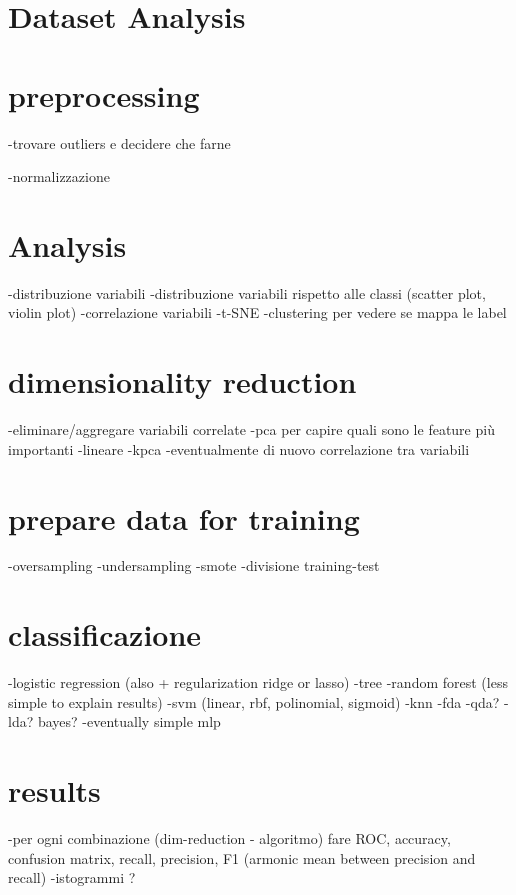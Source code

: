 \documentclass[letterpaper]{article}
\begin{document}
	\section{Dataset Analysis}
	
	
	\section{preprocessing}
	-trovare outliers e decidere che farne
	
	-normalizzazione
	
	\section{Analysis}
	-distribuzione variabili
	-distribuzione variabili rispetto alle classi (scatter plot, violin plot)
	-correlazione variabili
	-t-SNE
	-clustering per vedere se mappa le label
	
	\section{dimensionality reduction}
	-eliminare/aggregare variabili correlate 
	-pca per capire quali sono le feature più importanti
		-lineare
		-kpca
	-eventualmente di nuovo correlazione tra variabili
	
	\section{prepare data for training}
	-oversampling
	-undersampling
	-smote
	-divisione training-test
	
	\section{classificazione}
	-logistic regression (also + regularization ridge or lasso)
	-tree
	-random forest (less simple to explain results)
	-svm (linear, rbf, polinomial, sigmoid)
	-knn
	-fda
	-qda?
	-lda? bayes?
	-eventually simple mlp
	
	\section{results}
	-per ogni combinazione (dim-reduction - algoritmo) fare ROC, accuracy, confusion matrix, recall, precision, F1 (armonic mean between precision and recall)
	-istogrammi ? 
	
	
	
	\newpage
	\printbibliography
	
\end{document}
